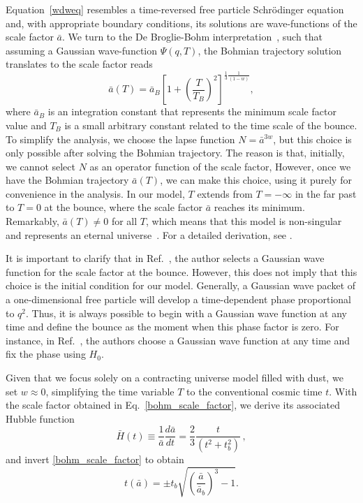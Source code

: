 \documentclass[a4paper,11pt]{article}
\newcommand{\dpar}[1]{\left(#1 \right)}
\newcommand{\dcol}[1]{\left[#1 \right]}
\begin{document}
Equation~\eqref{wdweq} resembles a time-reversed free particle Schrödinger equation and,
with appropriate boundary conditions, its solutions are wave-functions of the scale
factor $\bar{a}$. We turn to the De Broglie-Bohm
interpretation~\cite{mukhanov2005physical, nelson2000bohm}, such that assuming a Gaussian
wave-function $\Psi(q, T)$, the Bohmian trajectory solution translates to the scale
factor reads
\begin{equation}
	\label{bohm_scale_factor}
	\bar{a}(T) = \bar{a}_{B}\dcol{1 + \dpar{ \frac{T}{T_{ B}} }^2 }^{{\frac{1}{3}\frac{1}{\dpar{1-w}} } }  ,
\end{equation}
where $\bar{a}_{B}$ is an integration constant that represents the minimum scale factor
value and $T_B$ is a small arbitrary constant related to the time scale of the bounce.
	{\color{red} To simplify the analysis, we choose the lapse function $N = \bar{a}^{3w}$,
		but this choice is only possible after solving the Bohmian trajectory. The reason is
		that, initially, we cannot select $N$ as an operator function of the scale factor,
		However, once we have the Bohmian trajectory $\bar{a}(T)$, we can make this choice,
		using it purely for convenience in the analysis. In our model, $T$ extends from $T =
			-\infty$ in the far past to $T = 0$ at the bounce, where the scale factor $\bar{a}$
		reaches its minimum. } Remarkably, $\bar{a}(T) \neq 0$ for all $T$, which means that
this model is non-singular and represents an eternal
universe~\cite{nelson_peter_bouncing_original}. For a detailed derivation, see
\cite{nelson2021bouncing}.

{\color{red} It is important to clarify that in Ref.~\cite{nelson2021bouncing}, the
author selects a Gaussian wave function for the scale factor at the bounce. However,
this does not imply that this choice is the initial condition for our model. Generally,
a Gaussian wave packet of a one-dimensional free particle will develop a time-dependent
phase proportional to $q^2$. Thus, it is always possible to begin with a Gaussian wave
function at any time and define the bounce as the moment when this phase factor is zero.
For instance, in Ref.~\cite{Peter2016a}, the authors choose a Gaussian wave function at
any time and fix the phase using $H_0$. }

Given that we focus solely on a contracting universe model filled with dust, we set $w
	\approx 0$, simplifying the time variable $T$ to the conventional cosmic time $t$. With
the scale factor obtained in Eq.~\eqref{bohm_scale_factor}, we derive its associated
Hubble function
\begin{equation}\label{bohm_hubble}
	\bar{H}(t) \equiv \frac{1}{\bar{a}}\frac{d\bar{a}}{dt} = \frac{2}{3}\frac{t}{ \dpar{ t^{2} + t^{2}_{b} } }\, ,
\end{equation}
and invert \eqref{bohm_scale_factor} to obtain
\begin{equation}\label{bohm_time}
	t(\bar{a}) = \pm t_{b}\sqrt{ \dpar{\frac{\bar{a}}{\bar{a}_{b}}}^{3} - 1 } .
\end{equation}
\end{document}
